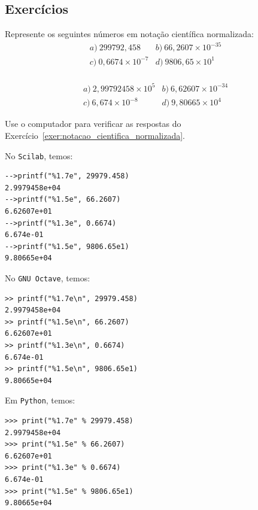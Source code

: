 \subsection{Exercícios}

\begin{exer}\label{exer:notacao_cientifica_normalizada}
  Represente os seguintes números em notação científica normalizada:
  \begin{equation*}
    \begin{array}{ll}
      a)~299792,458 & b)~66,2607\times 10^{-35}\\
      c)~0,6674\times 10^{-7} & d)~9806,65\times 10^{1}
    \end{array}
  \end{equation*}
  \begin{eqnarray*}
  \end{eqnarray*}
\end{exer}
\begin{resp}
  \begin{equation*}
  \begin{array}{ll}
    a)~2,99792458\times 10^5 & b)~6,62607\times 10^{-34}\\
    c)~6,674\times 10^{-8} & d)~9,80665\times 10^4
  \end{array}
  \end{equation*}
\end{resp}

\begin{exer}
  Use o computador para verificar as respostas do Exercício~\ref{exer:notacao_cientifica_normalizada}.
\end{exer}
\ifisscilab
\begin{resp}
No \verb+Scilab+, temos:
\begin{verbatim}
-->printf("%1.7e", 29979.458)
2.9979458e+04 
-->printf("%1.5e", 66.2607)
6.62607e+01 
-->printf("%1.3e", 0.6674)
6.674e-01 
-->printf("%1.5e", 9806.65e1)
9.80665e+04 
\end{verbatim}
\end{resp}
\fi
\ifisoctave
\begin{resp}
No \verb+GNU Octave+, temos:
\begin{verbatim}
>> printf("%1.7e\n", 29979.458)
2.9979458e+04
>> printf("%1.5e\n", 66.2607)
6.62607e+01
>> printf("%1.3e\n", 0.6674)
6.674e-01
>> printf("%1.5e\n", 9806.65e1)
9.80665e+04
\end{verbatim}
\end{resp}
\fi
\ifispython
\begin{resp}
Em \verb+Python+, temos:
\begin{verbatim}
>>> print("%1.7e" % 29979.458)
2.9979458e+04
>>> print("%1.5e" % 66.2607)
6.62607e+01
>>> print("%1.3e" % 0.6674)
6.674e-01
>>> print("%1.5e" % 9806.65e1)
9.80665e+04
\end{verbatim}
\end{resp}
\fi


